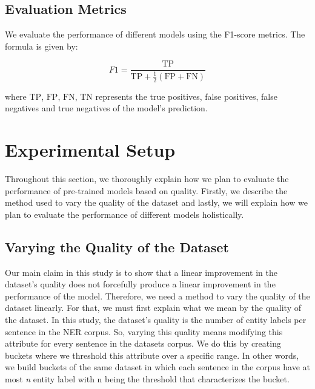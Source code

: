 \documentclass{article}
\begin{document}

\subsection{Evaluation Metrics}
We evaluate the performance of different models using the F1-score metrics. The formula is given by:

$$F1 = \frac{\mathrm{TP}}{\mathrm{TP}+\frac{1}{2}(\mathrm{FP}+\mathrm{FN})}$$

where $\mathrm{TP}$, $\mathrm{FP}$, $\mathrm{FN}$, $\mathrm{TN}$ represents the true positives, false positives, false negatives and true negatives of the model's prediction.

\section{Experimental Setup}
\label{sec:exp}
Throughout this section, we thoroughly explain how we plan to evaluate the performance of pre-trained models based on quality. Firstly, we describe the method used to vary the quality of the dataset and lastly, we will explain how we plan to evaluate the performance of different models holistically.


\subsection{Varying the Quality of the Dataset}
\label{sec:exp:var}
Our main claim in this study is to show that a linear improvement in the dataset's quality does not forcefully produce a linear improvement in the performance of the model. Therefore, we need a method to vary the quality of the dataset linearly. For that, we must first explain what we mean by the quality of the dataset. In this study, the dataset's quality is the number of entity labels per sentence in the NER corpus. So, varying this quality means modifying this attribute for every sentence in the datasets corpus. We do this by creating buckets where we threshold this attribute over a specific range. In other words, we build buckets of the same dataset in which each sentence in the corpus have at most \textit{n} entity label with n being the threshold that characterizes the bucket.
\end{document}
